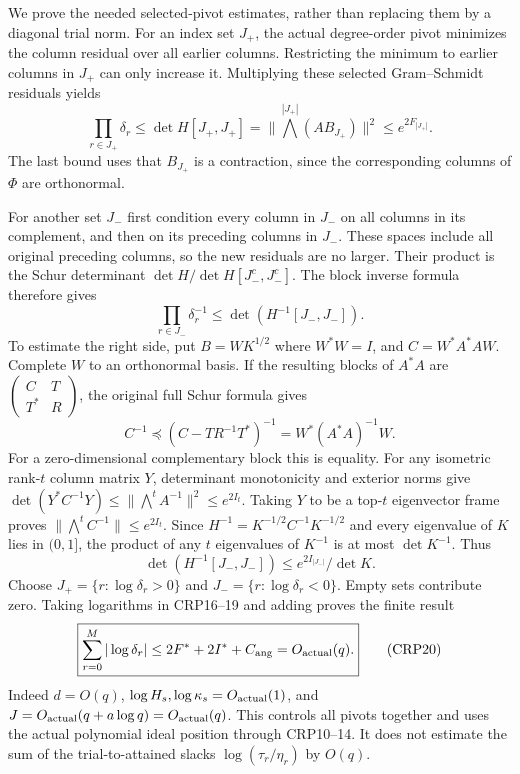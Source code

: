 \documentclass[11pt,a4paper]{article}
\begin{document}
We prove the needed selected-pivot estimates, rather than replacing
them by a diagonal trial norm. For an index set $J_+$, the actual
degree-order pivot minimizes the column residual over all earlier
columns. Restricting the minimum to earlier columns in $J_+$ can only
increase it. Multiplying these selected Gram--Schmidt residuals yields
\[
\prod_{r\in J_+}\delta_r\le\det H[J_+,J_+]
 =\|\bigwedge^{|J_+|}(AB_{J_+})\|^2
 \le e^{2F_{|J_+|}}.\tag{CRP16}
\]
The last bound uses that $B_{J_+}$ is a contraction, since the
corresponding columns of $\Phi$ are orthonormal.

For another set $J_-$ first condition every column in $J_-$ on all
columns in its complement, and then on its preceding columns in
$J_-$. These spaces include all original preceding columns, so the
new residuals are no larger. Their product is the Schur determinant
$\det H/\det H[J_-^c,J_-^c]$. The block inverse formula therefore gives
\[
\prod_{r\in J_-}\delta_r^{-1}
 \le\det(H^{-1}[J_-,J_-]).\tag{CRP17}
\]
To estimate the right side, put $B=WK^{1/2}$ where $W^*W=I$, and
$C=W^*A^*AW$. Complete $W$ to an orthonormal basis. If the resulting
blocks of $A^*A$ are $\left(\begin{smallmatrix}C&T\\T^*&R\end{smallmatrix}\right)$,
the original full Schur formula gives
\[
C^{-1}\preceq(C-TR^{-1}T^*)^{-1}=W^*(A^*A)^{-1}W.
\tag{CRP18}
\]
For a zero-dimensional complementary block this is equality. For
any isometric rank-$t$ column matrix $Y$, determinant monotonicity
and exterior norms give
$\det(Y^*C^{-1}Y)\le\|\bigwedge^t A^{-1}\|^2\le e^{2I_t}$.
Taking $Y$ to be a top-$t$ eigenvector frame proves
$\|\bigwedge^t C^{-1}\|\le e^{2I_t}$. Since
$H^{-1}=K^{-1/2}C^{-1}K^{-1/2}$ and every eigenvalue of $K$ lies in
$(0,1]$, the product of any $t$ eigenvalues of $K^{-1}$ is at most
$\det K^{-1}$. Thus
\[
\det(H^{-1}[J_-,J_-])\le e^{2I_{|J_-|}}/\det K.\tag{CRP19}
\]
Choose $J_+=\{r:\log\delta_r>0\}$ and
$J_-=\{r:\log\delta_r<0\}$. Empty sets contribute zero. Taking
logarithms in CRP16--19 and adding proves the finite result
\[
\boxed{\sum_{r=0}^M|\log\delta_r|
 \le 2F^*+2I^*+C_{\rm ang}=O_{\rm actual}(q).}\tag{CRP20}
\]
Indeed $d=O(q)$, $\log H_s,\log\kappa_s=O_{\rm actual}(1)$,
and $J=O_{\rm actual}(q+a\log q)=O_{\rm actual}(q)$.
This controls all pivots together and uses the actual polynomial
ideal position through CRP10--14. It does not estimate the sum of
the trial-to-attained slacks $\log(\tau_r/\eta_r)$ by $O(q)$.
\end{document}
